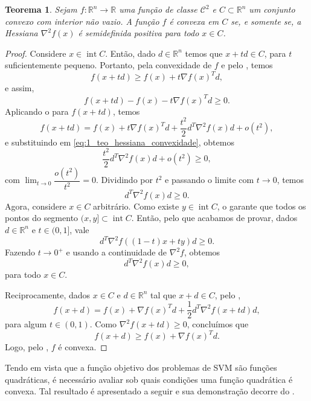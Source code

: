 \documentclass[12pt,a4paper]{scrartcl}
\DeclareMathOperator{\interior}{int}
\def\RR{\mathds{R}}
\newtheorem{teo}{Teorema}
\theoremstyle{definition}%
\begin{document}
\begin{teo} \label{teo:hessiana_convexidade}
Sejam $f:\RR^{n} \rightarrow \RR $ uma função de classe $\mathcal{C}^{2}$ e $C \subset \RR^{n}$ um conjunto convexo com interior não vazio. A função $f$ é convexa em $C$ se, e somente se, a Hessiana $\nabla^{2} f(x)$ é semidefinida positiva para todo $x \in C$.
\end{teo}
\begin{proof}
Considere $x \in \interior C$. Então, dado $d \in \RR^{n}$ temos que $x+td \in C$, para $t$ suficientemente pequeno. Portanto, pela convexidade de $f$ e pelo , temos
\[
f(x+td) \geq f(x) + t\nabla f(x)^{T} d ,
\]
e assim, 
\[ \label{eq:1_teo_hessiana_convexidade}
f(x+td) -f(x) - t\nabla f(x)^{T} d \geq 0 . 
\]
Aplicando o  para $f(x+td)$, temos
\[
f(x+td) = f(x) + t\nabla f(x)^{T}d + \dfrac{t^{2}}{2}d^{T} \nabla^{2} f(x)d + o(t^{2}) ,
\]
e substituindo em \eqref{eq:1_teo_hessiana_convexidade}, obtemos
\[
\dfrac{t^{2}}{2}d^{T} \nabla^{2} f(x)d + o(t^{2}) \geq 0 ,
\]
com $\lim_{t \rightarrow 0} \dfrac{o(t^{2})}{t^{2}} = 0$. 
Dividindo por $t^{2}$ e passando o limite com $t \rightarrow 0$, temos
\[
d^{T} \nabla^{2} f(x)d \geq 0 .
\]
Agora, considere $x \in C$ arbitrário. Como existe $y \in \interior C$, o  garante que todos os pontos do segmento $(x,y] \subset \interior C$. Então, pelo que acabamos de provar, dados $d \in \RR^{n}$ e $t\in (0,1]$, vale
\[
d^{T} \nabla^{2} f((1-t)x+ty)d \geq 0 .
\]
Fazendo $t \rightarrow 0^{+}$ e usando a continuidade de $\nabla^{2} f$, obtemos
\[
d^{T} \nabla^{2} f(x)d \geq 0,
\]
para todo $x \in C$.

Reciprocamente, dados $x \in C$ e $d \in \RR^{n}$ tal que $x+d \in C$, pelo ,
\[
f(x+d) = f(x) + \nabla f(x)^{T}d + \dfrac{1}{2}d^{T} \nabla^{2} f(x+td)d,
\]
para algum $t \in (0,1)$. Como $\nabla ^{2}f(x+td) \geq 0$, concluímos que 
\[
f(x+d) \geq f(x) + \nabla f(x)^{T}d .
\]
Logo, pelo , $f$ é convexa.
\end{proof}

Tendo em vista que a função objetivo dos problemas de SVM são funções quadráticas, é necessário avaliar sob quais condições uma função quadrática é convexa. Tal resultado é apresentado a seguir e sua demonstração decorre do .
\end{document}
